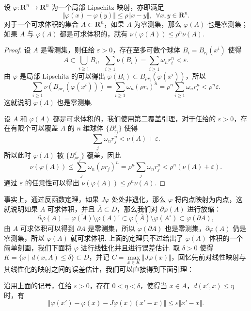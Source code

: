 \begin{lemma}{}{}
    设 $\varphi\colon\mathbf{R}^n\to \mathbf{R}^n$ 为一个局部 Lipschitz 映射，亦即满足\[\Vert \varphi(x) - \varphi(y)\Vert \leqslant \rho \Vert x - y\Vert,\enspace \forall x, y\in\mathbf{R}^n.\]
    对于一个可求体积的集合 $A\subset \mathbf{R}^n$，如果 $A$ 为零测集，那么 $\varphi(A)$ 也是零测集；如果 $A$ 与 $\varphi(A)$ 都是可求体积的，就有 $\nu(\varphi(A)) \leqslant \rho^n\nu(A)$.
\end{lemma}

\begin{proof}
    设 $A$ 是零测集，则任给 $\varepsilon > 0$，存在至多可数个球体 $B_i = B_{r_i}(x^i)$ 使得 \[A\subset \displaystyle\bigcup_{i\geqslant 1}B_i,\enspace \sum_{i\geqslant 1}\nu(B_i) = \sum_{i\geqslant 1}\omega_n r_i^n < \varepsilon.\]
    由 $\varphi$ 是局部 Lipschitz 的可以得出 $\varphi(B_i) \subset B_{\rho r_i}(\varphi(x^i))$，所以 \[\sum_{i\geqslant 1}\nu(B_{\rho r_i}(\varphi(x^i))) = \sum_{i\geqslant 1}\omega_n (\rho r_i)^n = \rho^n\sum_{i\geqslant 1}\omega_n r_i^n < \rho^n\varepsilon.\]
    这就说明 $\varphi(A)$ 也是零测集.

    设 $A$ 和 $\varphi(A)$ 都是可求体积的，我们使用第二覆盖引理，对于任给的 $\varepsilon > 0$，存在有限个可以覆盖 $A$ 的 $n$ 维球体 $\{B_{r_j}^j\}$ 使得 \[\sum_j\omega_n r_j^n < \nu(A) + \varepsilon.\]
    所以此时 $\varphi(A)$ 被 $\{B_{\rho r_j}^j\}$ 覆盖，因此 \[\nu(\varphi(A))\leqslant \sum_{j}\omega_n (\rho r_j)^n = \rho^n\sum_j\omega_n r_j^n < \rho^n(\nu(A) + \varepsilon).\]
    通过 $\varepsilon$ 的任意性可以得出 $\nu(\varphi(A)) \leqslant \rho^n\nu(A)$.
\end{proof}

事实上，通过反函数定理，如果 $J\varphi$ 处处非退化，那么 $\varphi$ 将内点映射为内点，这就说明如果 $A$ 可求体积，并且 $\overline{A}\subset D$，那么我们对 $\partial \varphi(A)$ 进行放缩：\[\partial \varphi(A) = \overline{\varphi(A)}\setminus \varphi(A)^{\circ} \subset \varphi(\overline{A})\setminus \varphi(A^{\circ}) \subset \varphi(\partial A),\]
由 $A$ 可求体积可以得到 $\partial A$ 是零测集，所以 $\varphi(\partial A)$ 也是零测集，$\partial \varphi(A)$ 仍是零测集，所以 $\varphi(A)$ 就可求体积. 上面的定理只不过给出了 $\varphi(A)$ 体积的一个简单刻画，我们下面将 $\varphi$ 进行线性化并且进行误差估计. 取 $\delta > 0$ 使得 $K = \{x \mid d(x, A) \leqslant \delta\} \subset D$，并记 $C = \max\limits_{x\in K}\Vert J\varphi(x)\Vert$，回忆先前对线性映射与其线性化的映射之间的误差估计，我们可以直接得到下面引理：

\begin{lemma}{}{}
    沿用上面的记号，任给 $\varepsilon >0$，存在 $0<\eta <\delta$，使得当 $x\in A$，$d(x', x)\leqslant \eta$ 时，有 \[\Vert \varphi(x') - \varphi(x) - J\varphi(x)(x' - x)\Vert\leqslant \varepsilon\Vert x' - x\Vert.\]
\end{lemma}

